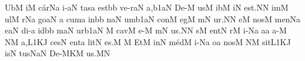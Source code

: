 \bigskip
\bigskip


\Internote
\nosolesmescustos
\initiumgregorianum
{}%
\sgn {}Ub\punctum M\egn
\sgn {}i{}\punctum M\egn
\spatium
\sgn c{\'a}r\pes Na\egn
\sgn {}i-\clivis aN\egn
\sgn tas\punctum a\egn
\spatium
\sgn {}e{st}\bmolle b\punctum b\egn
\spatium
\sgn ve{-r}\clivis aN\egn
\sgn {}a{,}\episem b1\clivis aN\egn
\spatium
\divisiominima
\spatium
\sgn D{e}-\punctum M\egn
\sgn {}us\punctum M\egn
\spatium
\sgn {}ib\punctum M\egn
\sgn {}i{}\punctum N\egn
\spatium
\sgn {}e{st.}\punctum N\augmentum N\egn
\spatium
\divisiofinalis
\spatium
{}im\punctum M\egn
\sgn {}ul\punctum M\egn
\spatium
{}r\pes Na\egn
\sgn go{}\clivis aN\egn
\spatium
\custos a
\lineaproxima
\sgn cum\punctum a\egn
\spatium
\sgn {}in\bmolle b\punctum b\egn
\spatium
{}n\clivis aN\egn
\sgn {}um\episem b1\clivis aN\egn
\spatium
\divisiominima
\spatium
\sgn con\punctum M\egn
{}eg\punctum M\egn
{}m\punctum N\egn
\sgn {}u{r.}\punctum N\augmentum N\egn
\spatium
\divisiofinalis
\spatium
{}e{}\punctum M\egn
\spatium
\sgn nos\punctum M\egn
\spatium
\sgn m{e}n\pes Na\egn
{}e{}\clivis aN\egn
\spatium
\sgn di-\punctum a\egn
{}id\bmolle b\punctum b\egn
{}m\clivis aN\egn
\sgn {}ur\episem b1\clivis aN\egn
\spatium
\divisiominima
\spatium
\custos M
\lineaproxima
\sgn cav\punctum M\egn
\sgn {}e-\punctum M\egn
{}m\punctum N\egn
\sgn {}u{s.}\punctum N\augmentum N\egn
\spatium
\divisiofinalis
\spatium
{}s\punctum M\egn
{}e{nt}\punctum N\egn
\spatium
{}r\punctum M\egn
{}i{-}\pes Na\egn
\sgn {}a{}\punctum a\egn
\spatium
{}a-\punctum M\egn
{}\clivis NM\egn
\sgn {}a,\episem L1\clivis KJ\egn
\spatium
\sgn c{e}s\punctum N\egn
{}e{nt}\punctum a\egn
\spatium
\sgn l{i}t\punctum N\egn
\sgn {}e{s.}\punctum M\egn
\spatium
\divisiofinalis
\spatium
\custos M
\lineaproxima
{}Et\punctum M\egn
\spatium
\sgn {}in\punctum N\egn
\spatium
\sgn m{\'e}d\punctum M\egn
\sgn {}i-\pes Na\egn
\sgn {}o{}\punctum a\egn
\spatium
\sgn n{o}s\punctum M\egn
{}\clivis NM\egn
\spatium
\sgn sit\episem L1\clivis KJ\egn
\spatium
{}is\punctum N\egn
\sgn tus\torculus NaN\egn
\spatium
\sgn D{e}-\porrectus MKM\egn
\sgn {}u{s.}\punctum M\augmentum N\egn
\spatium
\Finisgregoriana

